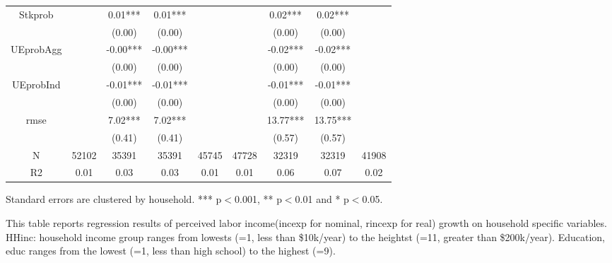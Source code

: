 \begin{table}[p]
\begin{adjustbox}{width={\textwidth}}
\begin{threeparttable}
\begin{tabular}{ccccccccc}
Stkprob          &           &   0.01*** &    0.01*** &             &           &    0.02*** &     0.02*** &              \\
                 &           &    (0.00) &     (0.00) &             &           &     (0.00) &      (0.00) &              \\
UEprobAgg        &           &  -0.00*** &   -0.00*** &             &           &   -0.02*** &    -0.02*** &              \\
                 &           &    (0.00) &     (0.00) &             &           &     (0.00) &      (0.00) &              \\
UEprobInd        &           &  -0.01*** &   -0.01*** &             &           &   -0.01*** &    -0.01*** &              \\
                 &           &    (0.00) &     (0.00) &             &           &     (0.00) &      (0.00) &              \\
rmse             &           &   7.02*** &    7.02*** &             &           &   13.77*** &    13.75*** &              \\
                 &           &    (0.41) &     (0.41) &             &           &     (0.57) &      (0.57) &              \\
N                &     52102 &     35391 &      35391 &       45745 &     47728 &      32319 &       32319 &        41908 \\
R2               &      0.01 &      0.03 &       0.03 &        0.01 &      0.01 &       0.06 &        0.07 &         0.02 \\
\bottomrule
\end{tabular}
\begin{tablenotes}\item Standard errors are clustered by household. *** p$<$0.001, ** p$<$0.01 and * p$<$0.05. 
\item This table reports regression results of perceived labor income(incexp for nominal, rincexp for real) growth on household specific variables. HHinc: household income group ranges from lowests (=1, less than \$10k/year) to the heightst (=11, greater than \$200k/year). Education, educ ranges from the lowest (=1, less than high school) to the highest (=9).
\end{tablenotes}
\end{threeparttable}
\end{adjustbox}
\end{table}
